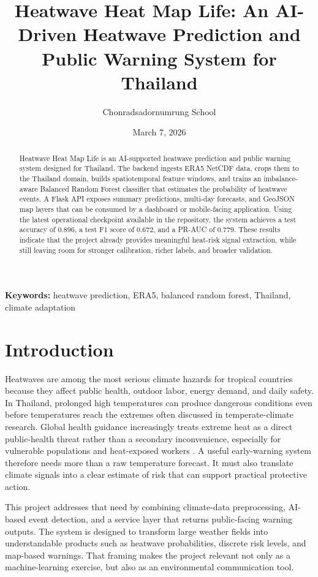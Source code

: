 \documentclass[12pt,a4paper]{article}
\title{\textbf{Heatwave Heat Map Life: An AI-Driven Heatwave Prediction and Public Warning System for Thailand}}
\author{Chonradsadornumrung School}
\date{March 7, 2026}
\begin{document}
\maketitle

\begin{abstract}
Heatwave Heat Map Life is an AI-supported heatwave prediction and public warning system designed for Thailand. The backend ingests ERA5 NetCDF data, crops them to the Thailand domain, builds spatiotemporal feature windows, and trains an imbalance-aware Balanced Random Forest classifier that estimates the probability of heatwave events. A Flask API exposes summary predictions, multi-day forecasts, and GeoJSON map layers that can be consumed by a dashboard or mobile-facing application. Using the latest operational checkpoint available in the repository, the system achieves a test accuracy of 0.896, a test F1 score of 0.672, and a PR-AUC of 0.779. These results indicate that the project already provides meaningful heat-risk signal extraction, while still leaving room for stronger calibration, richer labels, and broader validation.
\end{abstract}

\noindent\textbf{Keywords:} heatwave prediction, ERA5, balanced random forest, Thailand, climate adaptation

\section{Introduction}
Heatwaves are among the most serious climate hazards for tropical countries because they affect public health, outdoor labor, energy demand, and daily safety. In Thailand, prolonged high temperatures can produce dangerous conditions even before temperatures reach the extremes often discussed in temperate-climate research. Global health guidance increasingly treats extreme heat as a direct public-health threat rather than a secondary inconvenience, especially for vulnerable populations and heat-exposed workers \cite{whoheat}. A useful early-warning system therefore needs more than a raw temperature forecast. It must also translate climate signals into a clear estimate of risk that can support practical protective action.

This project addresses that need by combining climate-data preprocessing, AI-based event detection, and a service layer that returns public-facing warning outputs. The system is designed to transform large weather fields into understandable products such as heatwave probabilities, discrete risk levels, and map-based warnings. That framing makes the project relevant not only as a machine-learning exercise, but also as an environmental communication tool.
\end{document}
